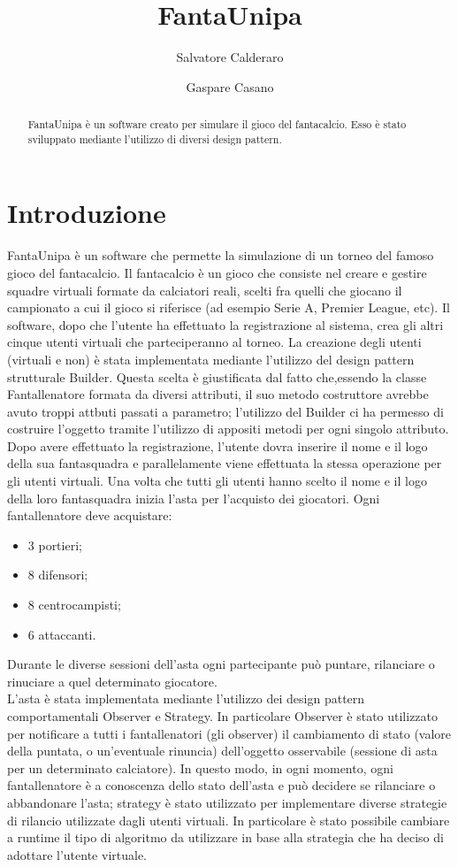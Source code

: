\documentclass[12pt,a4paper]{article}
\title{FantaUnipa}
\author{Salvatore Calderaro \and Gaspare Casano}
\begin{document}
\maketitle
\newpage
\tableofcontents
\newpage
\begin{abstract}
FantaUnipa è un software creato per simulare il gioco del fantacalcio. Esso è stato sviluppato mediante l'utilizzo di diversi design pattern.
\end{abstract}
\newpage
\section{Introduzione}
FantaUnipa è un software che permette la simulazione di un torneo del famoso gioco del fantacalcio. Il fantacalcio è un gioco che consiste nel creare e gestire squadre virtuali formate da calciatori reali, scelti fra quelli che giocano il campionato a cui il gioco si riferisce (ad esempio Serie A, Premier League, etc). Il software, dopo che l'utente ha effettuato la registrazione al sistema, crea gli altri cinque utenti virtuali che parteciperanno al torneo. La creazione degli utenti (virtuali e non) è stata implementata mediante l'utilizzo del design pattern strutturale Builder. Questa scelta è giustificata dal fatto che,essendo la classe Fantallenatore formata da diversi attributi, il suo metodo costruttore avrebbe avuto troppi attbuti passati a parametro; l'utilizzo del Builder ci ha permesso di costruire l'oggetto tramite l'utilizzo di appositi metodi per ogni singolo attributo.\\
Dopo avere effettuato la registrazione, l'utente dovra inserire il nome e il logo della sua fantasquadra e parallelamente viene effettuata la stessa operazione per gli utenti virtuali. Una volta che tutti gli utenti hanno scelto il nome e il logo della loro fantasquadra inizia l'asta per l'acquisto dei giocatori. Ogni fantallenatore deve acquistare:
\begin{itemize}
\item 3 portieri;
\item 8 difensori;
\item 8 centrocampisti;
\item 6 attaccanti.
\end{itemize}
Durante le diverse sessioni dell'asta ogni partecipante può puntare, rilanciare o rinuciare a quel determinato giocatore.\\
L'asta è stata implementata mediante l'utilizzo dei design pattern comportamentali Observer e Strategy. In particolare Observer è stato utilizzato per notificare a tutti i fantallenatori (gli observer) il cambiamento di stato (valore della puntata, o un'eventuale rinuncia) dell'oggetto osservabile (sessione di asta per un determinato calciatore). In questo modo, in ogni momento, ogni fantallenatore è a conoscenza dello stato dell'asta e può decidere se rilanciare o abbandonare l'asta; strategy è stato utilizzato per implementare diverse strategie di rilancio utilizzate dagli utenti virtuali. In particolare è stato possibile cambiare a runtime il tipo di algoritmo da utilizzare in base alla strategia che ha deciso di adottare l'utente virtuale.\\
\end{document}

